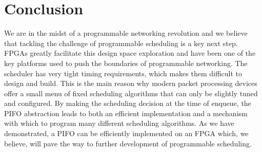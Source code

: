 \section{Conclusion}

We are in the midst of a programmable networking revolution and we believe that tackling the challenge of programmable scheduling is a key next step. FPGAs greatly facilitate this design space exploration and have been one of the key platforms used to push the boundaries of programmable networking. The scheduler has very tight timing requirements, which makes them difficult to design and build. This is the main reason why modern packet processing devices offer a small menu of fixed scheduling algorithms that can only be slightly tuned and configured. By making the scheduling decision at the time of enqueue, the PIFO abstraction leads to both an efficient implementation and a mechanism with which to program many different scheduling algorithms. As we have demonstrated, a PIFO can be efficiently implemented on an FPGA which, we believe, will pave the way to further development of programmable scheduling.




